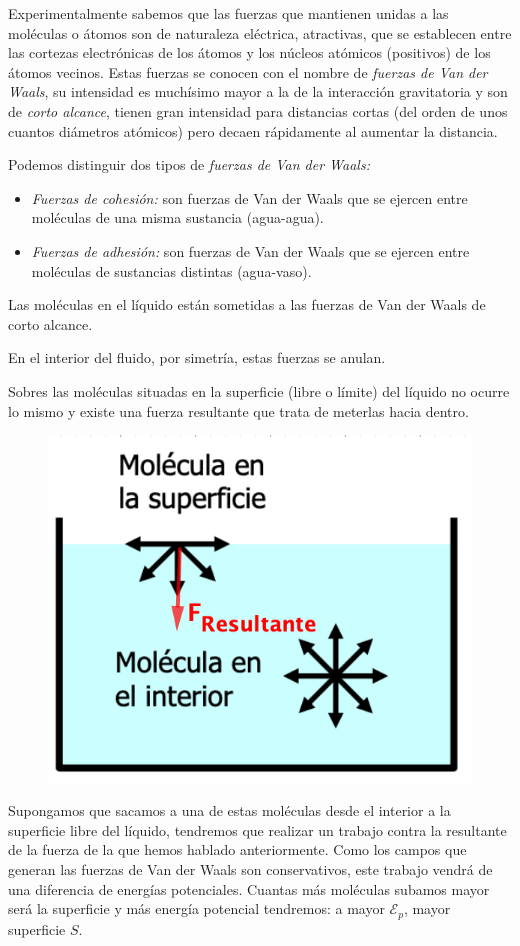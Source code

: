 Experimentalmente sabemos que las fuerzas que mantienen unidas a las moléculas o átomos son de naturaleza eléctrica, atractivas, que se establecen entre las cortezas electrónicas de los átomos y los núcleos atómicos (positivos) de los átomos vecinos. Estas fuerzas se conocen con el nombre de \emph{fuerzas de Van der Waals}, su intensidad es muchísimo mayor a la de la interacción gravitatoria y son de \emph{corto alcance}, tienen gran intensidad para distancias cortas (del orden de unos cuantos diámetros atómicos) pero decaen rápidamente al aumentar la distancia.

Podemos distinguir dos tipos de \emph{fuerzas de Van der Waals:}
\begin{itemize}
\vspace{-2mm} \item \emph{Fuerzas de cohesión:} son fuerzas de Van der Waals que se ejercen entre moléculas de una misma sustancia (agua-agua).
\vspace{-2mm} \item \emph{Fuerzas de adhesión:} son fuerzas de Van der Waals que se ejercen entre moléculas de sustancias distintas (agua-vaso).	
\end{itemize}
Las moléculas en el líquido están sometidas a las fuerzas de Van der Waals de corto alcance.
\begin{multicols}{2}
En el interior del fluido, por simetría, estas fuerzas se anulan.

Sobres las moléculas situadas en la superficie (libre o límite) del líquido no ocurre lo mismo y existe una fuerza resultante que trata de meterlas hacia dentro.
\begin{figure}[H]
	\centering
	\includegraphics[width=.4\textwidth]{imagenes/imagenes08/T08IM02.png}
\end{figure}
\end{multicols}
Supongamos que sacamos a una de estas moléculas desde el interior a la superficie libre del líquido, tendremos que realizar un trabajo contra la resultante de la fuerza de la que hemos hablado anteriormente. Como los campos que generan las fuerzas de Van der Waals son conservativos, este trabajo vendrá de una diferencia de energías potenciales. Cuantas más moléculas subamos mayor será la superficie y más energía potencial tendremos: a mayor $\mathcal E_p$, mayor superficie $S$.

